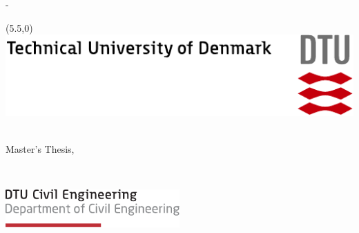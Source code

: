 \begin{titlingpage}
	\thispagestyle{empty}
	\enlargethispage{1.3cm}
	\calccentering{\unitlength}
	\begin{adjustwidth}{\unitlength}{-\unitlength}
		\vspace*{-1.9cm}
		\begin{textblock}{6.5}(5.5,0) %
			\includegraphics[width=\textwidth]{gfx/DTULogo}
		\end{textblock}

		\begin{raggedright}
			\begin{Spacing}{1.2}
				{\sffamily\HUGE\textbf{\ThTitleEN}\\[1.5cm]}
				{\sffamily\LARGE{Master's Thesis, \ThEndDate}\\[2cm]}
			\end{Spacing}
			{\LARGE\sffamily\ThAuthors\\[2cm]}
		\end{raggedright}
		\begin{raggedright}
			\includegraphics[width=0.5\textwidth]{gfx/DTUBYGlogo}%
\end{raggedright}
\end{adjustwidth}
\end{titlingpage}
